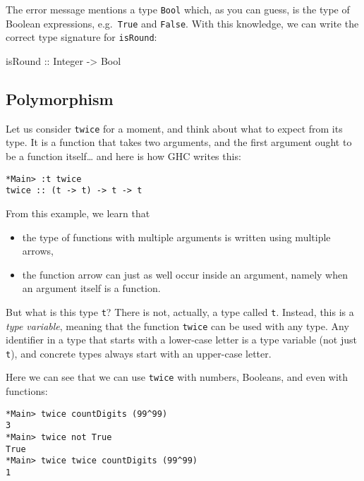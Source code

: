 \documentclass[11pt,
  american,
  DIV13]{article}
\newenvironment{Shaded}{}{}
\newcommand{\DataTypeTok}[1]{\textcolor[rgb]{0.56,0.13,0.00}{#1}}
\newcommand{\OtherTok}[1]{\textcolor[rgb]{0.00,0.44,0.13}{#1}}
\providecommand{\tightlist}{%
  \setlength{\itemsep}{0pt}\setlength{\parskip}{0pt}}
\begin{document}
The error message mentions a type \texttt{Bool} which, as you can guess,
is the type of Boolean expressions, e.g.~\texttt{True} and
\texttt{False}. With this knowledge, we can write the correct type
signature for \texttt{isRound}:

\begin{Shaded}
\begin{Highlighting}[]
\OtherTok{isRound ::} \DataTypeTok{Integer} \OtherTok{{-}\textgreater{}} \DataTypeTok{Bool}
\end{Highlighting}
\end{Shaded}

\hypertarget{polymorphism}{%
\subsection{Polymorphism}\label{polymorphism}}

Let us consider \texttt{twice} for a moment, and think about what to
expect from its type. It is a function that takes two arguments, and the
first argument ought to be a function itself\ldots{} and here is how GHC
writes this:

\begin{verbatim}
*Main> :t twice
twice :: (t -> t) -> t -> t
\end{verbatim}

From this example, we learn that

\begin{itemize}
\tightlist
\item
  the type of functions with multiple arguments is written using
  multiple arrows,
\item
  the function arrow can just as well occur inside an argument, namely
  when an argument itself is a function.
\end{itemize}

But what is this type \texttt{t}? There is not, actually, a type called
\texttt{t}. Instead, this is a \emph{type variable}, meaning that the
function \texttt{twice} can be used with any type. Any identifier in a
type that starts with a lower-case letter is a type variable (not just
\texttt{t}), and concrete types always start with an upper-case letter.

Here we can see that we can use \texttt{twice} with numbers, Booleans,
and even with functions:

\begin{verbatim}
*Main> twice countDigits (99^99)
3
*Main> twice not True
True
*Main> twice twice countDigits (99^99)
1
\end{verbatim}
\end{document}
